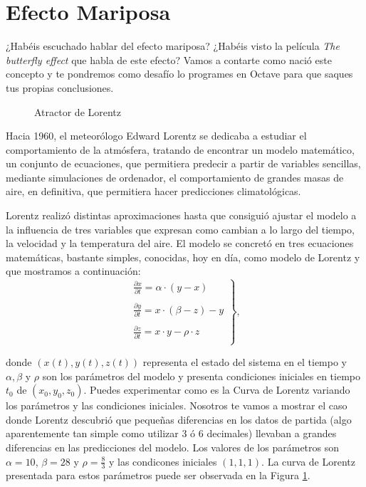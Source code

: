 \section{Efecto Mariposa}
¿Habéis escuchado hablar del efecto mariposa? ¿Habéis visto la
película \emph{The butterfly effect} que habla de este efecto? Vamos a
contarte como nació este concepto y te pondremos como desafío lo
programes en Octave para que saques tus propias conclusiones.

\begin{figure}[ht!]
\centering \scalebox{0.5}{}
\caption{Atractor de Lorentz}
\label{Lorentz}
\end{figure}

Hacia 1960, el meteorólogo Edward Lorentz se dedicaba a estudiar el comportamiento de la
atmósfera, tratando de encontrar un modelo matemático, un conjunto de ecuaciones, que
permitiera predecir a partir de variables sencillas, mediante simulaciones de ordenador, el
comportamiento de grandes masas de aire, en definitiva, que permitiera hacer predicciones
climatológicas.

Lorentz realizó distintas aproximaciones hasta que consiguió ajustar el modelo a la influencia de tres
variables que expresan como cambian a lo largo del tiempo, la velocidad y la temperatura del aire.
El modelo se concretó en tres ecuaciones matemáticas, bastante simples, conocidas, hoy en día,
como modelo de Lorentz y que mostramos a continuación:
\begin{equation}\left.
\begin{array}{l}
\frac{\partial x}{\partial t}=\alpha \cdot (y-x)\\
\\
\frac{\partial y}{\partial t}=x\cdot(\beta-z)-y\\
\\
\frac{\partial z}{\partial t}=x\cdot y-\rho\cdot z\\
\end{array}\right\},
\end{equation}

donde $(x(t),y(t),z(t))$ representa el estado del sistema en el tiempo y $\alpha, \beta$ y $\rho$ son los parámetros del modelo y presenta condiciones iniciales en tiempo $t_0$ de $(x_0,y_0,z_0)$.
Puedes experimentar como es la Curva de Lorentz variando los parámetros y las condiciones iniciales. Nosotros te vamos a mostrar el caso donde Lorentz descubrió
que pequeñas diferencias en los datos de
partida (algo aparentemente tan simple como utilizar 3 ó 6 decimales) llevaban a grandes diferencias
en las predicciones del modelo. Los valores de los parámetros son $\alpha=10$, $\beta=28$ y $\rho=\frac{8}{3}$ y las condicones iniciales $(1,1,1)$.
La curva de Lorentz presentada para estos parámetros puede ser observada en la Figura \ref{Lorentz}.

